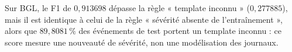 
Sur BGL, le F1 de $0{,}913698$ dépasse la règle « template inconnu » ($0{,}277885$), mais il est identique à celui de la règle « sévérité absente de l'entraînement », alors que $89{,}8081\,\%$ des événements de test portent un template inconnu : ce score mesure une nouveauté de sévérité, non une modélisation des journaux.
